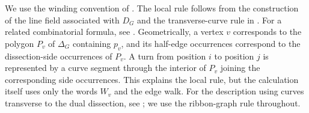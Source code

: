 \documentclass[11pt]{amsart}
\theoremstyle{definition}
\theoremstyle{plain}
\theoremstyle{definition}
\theoremstyle{definition}
\begin{document}
We use the winding convention of
\cite[Definition~3.2]{AmiotPlamondonSchroll}.
The local rule follows from the construction of the line
field associated with $D_G$ and the transverse-curve rule
in \cite[Lemma~3.18]{AmiotPlamondonSchroll}.
For a related combinatorial formula, see
\cite[Remark~3.15]{LekiliPolishchuk}.
Geometrically, a vertex $v$ corresponds to the polygon $P_v$
of $\Delta_G$ containing $p_v$, and its half-edge occurrences
correspond to the dissection-side occurrences of $P_v$.
A turn from position $i$ to position $j$ is represented
by a curve segment through the interior of $P_v$ joining
the corresponding side occurrences. This explains the
local rule, but the calculation itself uses only the
words $W_v$ and the edge walk.
For the description using curves transverse to the dual dissection,
see \cite[Lemma~3.18]{AmiotPlamondonSchroll}; we use the ribbon-graph
rule throughout.
\end{document}
